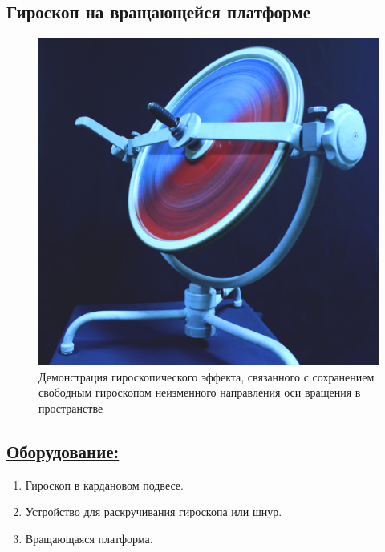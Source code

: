 \documentclass[14pt,a4paper,oneside]{extarticle}	%
\begin{document}
	
	
	\begin{center}
		\subsection*{Гироскоп на вращающейся платформе}
	\end{center}
	
	\begin{figure}[H] 	
		\centering 	
		\includegraphics[width=0.75\linewidth]{gyro-1.png}
		\caption{Демонстрация гироскопического эффекта, связанного с сохранением свободным гироскопом неизменного направления оси вращения в пространстве}
		\label{gyro-1}
	\end{figure}
	
	\subsection*{\underline{Оборудование:}}

			\begin{enumerate} 
			\item Гироскоп в кардановом подвесе.
			\item Устройство для раскручивания гироскопа или шнур.
			\item Вращающаяся платформа.
		\end{enumerate}
\end{document}
